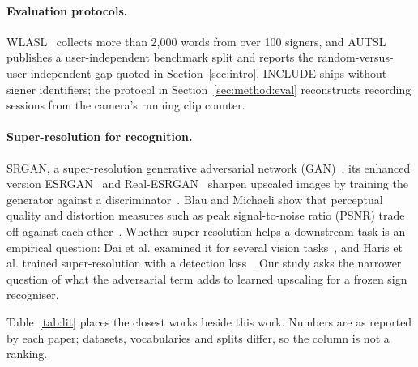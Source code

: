 \documentclass[pdflatex,sn-mathphys-num,twocolumn]{sn-jnl}
\theoremstyle{thmstyleone}%
\begin{document}
\paragraph{Evaluation protocols.} WLASL~\cite{li2020wlasl} collects more than 2,000 words from over 100 signers, and AUTSL~\cite{sincan2020autsl} publishes a user-independent benchmark split and reports the random-versus-user-independent gap quoted in Section~\ref{sec:intro}. INCLUDE ships without signer identifiers; the protocol in Section~\ref{sec:method:eval} reconstructs recording sessions from the camera's running clip counter.

\paragraph{Super-resolution for recognition.} SRGAN, a super-resolution generative adversarial network (GAN)~\cite{ledig2017srgan}, its enhanced version ESRGAN~\cite{wang2018esrgan} and Real-ESRGAN~\cite{wang2021realesrgan} sharpen upscaled images by training the generator against a discriminator~\cite{goodfellow2014gan}. Blau and Michaeli show that perceptual quality and distortion measures such as peak signal-to-noise ratio (PSNR) trade off against each other~\cite{blau2018pd}. Whether super-resolution helps a downstream task is an empirical question: Dai et al. examined it for several vision tasks~\cite{dai2016srhelpful}, and Haris et al. trained super-resolution with a detection loss~\cite{haris2018taskdriven}. Our study asks the narrower question of what the adversarial term adds to learned upscaling for a frozen sign recogniser.

Table~\ref{tab:lit} places the closest works beside this work. Numbers are as reported by each paper; datasets, vocabularies and splits differ, so the column is not a ranking.
\end{document}
